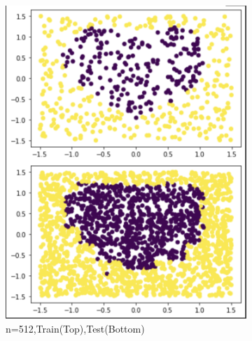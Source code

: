 \documentclass[a4paper]{article}
\theoremstyle{definition}
\newenvironment{soln}{
    \leavevmode\color{blue}\ignorespaces
}{}
\begin{document}
\begin{soln}
\begin{figure}[H]
\begin{subfigure}{0.5\textwidth}
            \includegraphics[scale=0.5]{sk512.png}
            \caption{n=512,Train(Top),Test(Bottom)}
            \label{fig:q2}
        \end{subfigure}
        \begin{subfigure}{0.5\textwidth}
            \centering

\end{subfigure}
\end{figure}
\end{soln}
\end{document}
